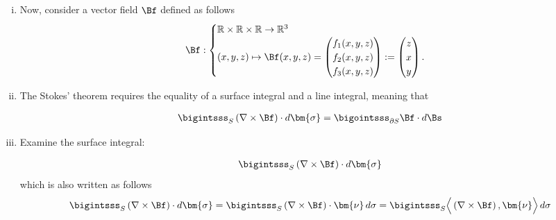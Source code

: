 \documentclass[12pt]{article}
\begin{document}
\begin{enumerate}[(i)]
	\item Now, consider a vector field $\Bf$ defined as follows
	      \begin{align}
		      \label{eq:vectorfieldf}
		      \Bf:
		      \begin{cases}
			      \mathbb{R}\times\mathbb{R}\times\mathbb{R} \to \mathbb{R}^3 \\
			      (x,y,z) \mapsto \Bf(x,y,z)
			      =
			      \begin{pmatrix}
				      f_{1}(x,y,z) \\ f_{2}(x,y,z) \\f_{3}(x,y,z)
			      \end{pmatrix}
			      :=
			      \begin{pmatrix}
				      z \\x\\y
			      \end{pmatrix}.
		      \end{cases}
	      \end{align}
	      
	\item The Stokes' theorem requires the equality of
	      a surface integral and a line integral, meaning that 
	      \begin{mdframed}
		      \begin{align}
			      \bigintsss_{S} \left( \nabla \times \Bf \right) \cdot d\bm{\sigma}
			      =
			      \bigointsss_{\partial S} \Bf \cdot d \Bs
		      \end{align}
	      \end{mdframed}
	      
	\item Examine the surface integral:
	      \begin{mdframed}
		      \begin{align}
			      \bigintsss_{S} \left( \nabla \times \Bf \right) \cdot d\bm{\sigma}
		      \end{align}
		      which is also written as follows 
		      \begin{align}
			      \label{eq:surfacsimilar}
			      \bigintsss_{S} \left( \nabla \times \Bf \right) \cdot d\bm{\sigma}
			      = 
			      \bigintsss_{S} \left( \nabla \times \Bf \right) \cdot \bm{\nu} \, d\sigma
			      =
			      \bigintsss_{S} \Big\langle \left( \nabla \times \Bf \right), \bm{\nu} \Big\rangle \, d\sigma
		      \end{align}
	      \end{mdframed}
	      

\end{enumerate}
\end{document}
